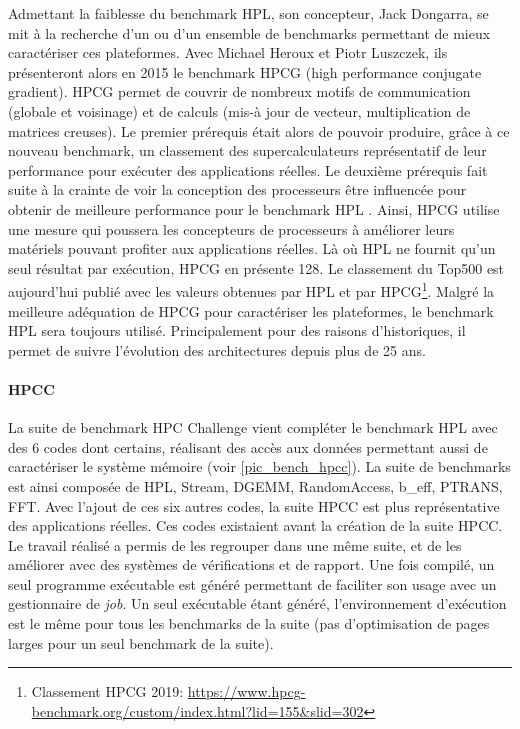             Admettant la faiblesse du benchmark HPL, son concepteur, Jack Dongarra, se mit à la recherche d'un ou d'un ensemble de benchmarks permettant de mieux caractériser ces plateformes. Avec Michael Heroux et Piotr Luszczek, ils présenteront alors en 2015 le benchmark HPCG (high performance conjugate gradient). HPCG permet de couvrir de nombreux motifs de communication (globale et voisinage) et de calculs  (mis-à jour de vecteur, multiplication de matrices creuses). 
            Le premier prérequis était alors de pouvoir produire, grâce à ce nouveau benchmark, un classement des supercalculateurs représentatif de leur performance pour exécuter des applications réelles. Le deuxième prérequis fait suite à la crainte de voir la conception des processeurs être influencée pour obtenir de meilleure performance pour le benchmark HPL \cite{Dongarra2013}. Ainsi, HPCG utilise une mesure qui poussera les concepteurs de processeurs à améliorer leurs matériels pouvant profiter aux applications réelles. Là où HPL ne fournit qu'un seul résultat par exécution, HPCG en présente 128. Le classement du Top500 est aujourd'hui publié avec les valeurs obtenues par HPL et par HPCG\footnote{Classement HPCG 2019: \url{https://www.hpcg-benchmark.org/custom/index.html?lid=155&slid=302}}. Malgré la meilleure adéquation de HPCG pour caractériser les plateformes, le benchmark HPL sera toujours utilisé. Principalement pour des raisons d'historiques, il permet de suivre l'évolution des architectures depuis plus de 25 ans. 
            
        \paragraph{HPCC \cite{Luszczek2006}} 
            
            La suite de benchmark HPC Challenge vient compléter le benchmark HPL avec des 6 codes dont certains, réalisant des accès aux données permettant aussi de caractériser le système mémoire (voir \autoref{pic_bench_hpcc}). La suite de benchmarks est ainsi composée de HPL, Stream, DGEMM, RandomAccess, b\_eff, PTRANS, FFT. Avec l'ajout de ces six autres codes, la suite HPCC est plus représentative des applications réelles. Ces codes existaient avant la création de la suite HPCC. Le travail réalisé a permis de les regrouper dans une même suite, et de les améliorer avec des systèmes de vérifications et de rapport. Une fois compilé, un seul programme exécutable est généré permettant de faciliter son usage avec un gestionnaire de \textit{job}. Un seul exécutable étant généré, l'environnement d'exécution est le même pour tous les benchmarks de la suite (pas d'optimisation de pages larges pour un seul benchmark de la suite). 
            
